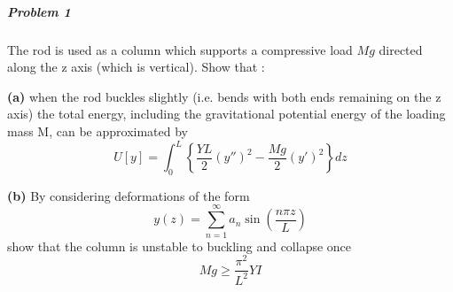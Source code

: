 \begin{framed}
\subparagraph{Problem 1}

The rod is used as a column which supports a compressive load $Mg$ directed along the z axis (which is vertical). Show that :

\textbf{(a)} when the rod buckles slightly (i.e. bends with both ends remaining on the z axis) the
total energy, including the gravitational potential energy of the loading mass M, can be
approximated by
\begin{equation}
\boxed{U[y]=\int_0^L \left\{ \frac{YL}{2} (y'')^2 - \frac{Mg}{2}(y')^2\right\}dz}
\end{equation}

\textbf{(b)} By considering deformations of the form
\begin{equation}
y(z)=\sum_{n=1}^{\infty} a_n\sin(\frac{n\pi z}{L})
\end{equation}
show that the column is unstable to buckling and collapse once
\begin{equation}
Mg \geq \frac{\pi^2}{L^2}YI
\end{equation}

\subparagraph{}
\end{framed}

